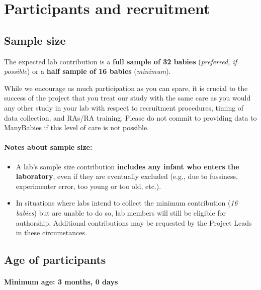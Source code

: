\documentclass[
  letterpaper,
  DIV=11,
  numbers=noendperiod,
  oneside]{scrreprt}
\providecommand{\tightlist}{%
  \setlength{\itemsep}{0pt}\setlength{\parskip}{0pt}}
\begin{document}
\chapter{Participants and recruitment}\label{sec-participants}

\section{Sample size}\label{sample-size}

The expected lab contribution is a \textbf{full sample of 32 babies}
(\emph{preferred, if possible}) or a \textbf{half sample of 16 babies}
(\emph{minimum}).

While we encourage as much participation as you can spare, it is crucial
to the success of the project that you treat our study with the same
care as you would any other study in your lab with respect to
recruitment procedures, timing of data collection, and RAs/RA training.
Please do not commit to providing data to ManyBabies if this level of
care is not possible.

\subsubsection{Notes about sample size:}\label{notes-about-sample-size}

\begin{itemize}
\tightlist
\item
  A lab's sample size contribution \textbf{includes any infant who
  enters the laboratory}, even if they are eventually excluded (e.g.,
  due to fussiness, experimenter error, too young or too old, etc.).
\item
  In situations where labs intend to collect the minimum contribution
  (\emph{16 babies}) but are unable to do so, lab members will still be
  eligible for authorship. Additional contributions may be requested by
  the Project Leads in these circumstances.
\end{itemize}

\section{Age of participants}\label{age-of-participants}

\subsubsection{\texorpdfstring{\textbf{Minimum age:} 3 months, 0
days}{Minimum age: 3 months, 0 days}}\label{minimum-age-3-months-0-days}
\end{document}
